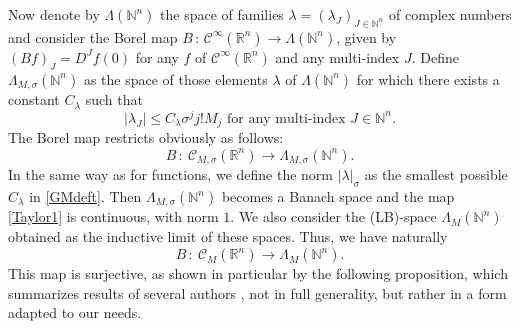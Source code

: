 \documentclass[a4paper]{amsart}
\theoremstyle{plain}
\theoremstyle{definition}
\theoremstyle{remark}
\begin{document}
Now denote by $ \Lambda(\mathbb{N}^n) $ the space of families
$ \lambda=(\lambda_J)_{J\in\mathbb{N}^n} $ 
of complex numbers and consider  
the Borel map $ B\, :\, \mathcal{C}^\infty(\mathbb{R}^n)\longrightarrow\Lambda(\mathbb{N}^n) $,
given by $ (Bf)_J=D^Jf(0) $ for any $ f $ of $ \mathcal{C}^\infty(\mathbb{R}^n) $ and
any multi-index $ J $. 
Define $ \Lambda_{M,\sigma}(\mathbb{N}^n) $ as the space of those elements
$ \lambda $ of $ \Lambda(\mathbb{N}^n) $ for which there exists a constant
$ C_\lambda $ such that
\begin{equation}\label{GMdeft}
\vert \lambda_J\vert\leq C_\lambda\sigma^j j! M_j\text{ for any multi-index }J\in
\mathbb{N}^n.
\end{equation}
The Borel map restricts obviously as follows:
\begin{equation}\label{Taylor1}
B\, :\ \mathcal{C}_{M,\sigma}(\mathbb{R}^n)\longrightarrow \Lambda_{M,\sigma}(\mathbb{N}^n).
\end{equation}
In the same way as for functions, we define the norm $ \vert \lambda\vert_\sigma $
as the smallest possible $ C_\lambda $ in \eqref{GMdeft}. Then 
$ \Lambda_{M,\sigma}(\mathbb{N}^n) $ becomes a Banach space and the map \eqref{Taylor1} is
continuous, with norm $ 1 $. We also consider the (LB)-space $ \Lambda_M(\mathbb{N}^n) $ obtained as the inductive limit of these spaces. Thus, we have naturally 
\begin{equation}\label{Taylor2}
B\, :\ \mathcal{C}_M(\mathbb{R}^n)\longrightarrow\Lambda_M(\mathbb{N}^n).
\end{equation}
This map is surjective, as shown in particular by the following proposition, which 
summarizes results of several authors \cite{BBMT}\cite{Bruna}\cite{CC2}\cite{Pet}, not in full generality, but rather in a form adapted to our needs.
\end{document}
